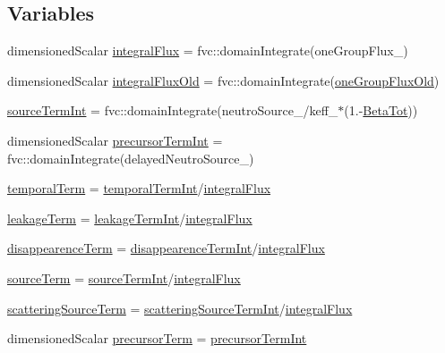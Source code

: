 \subsection*{Variables}
\begin{DoxyCompactItemize}
\item 
dimensioned\+Scalar \hyperlink{integralPredictor_8H_a2a0b08b13037e807e2dd9a5db5f493fa}{integral\+Flux} = fvc\+::domain\+Integrate(one\+Group\+Flux\+\_\+)
\item 
dimensioned\+Scalar \hyperlink{integralPredictor_8H_a96a9327735ca0a4dbb1ca5b12a8f209a}{integral\+Flux\+Old} = fvc\+::domain\+Integrate(\hyperlink{integralPredictorSP3_8H_a34c5d9843ad8c67cedc393b8b7e6d3a0}{one\+Group\+Flux\+Old})
\item 
\hyperlink{integralPredictor_8H_aa5ae446f24d87e14d8bd4df6d043998e}{source\+Term\+Int} = fvc\+::domain\+Integrate(neutro\+Source\+\_\+/keff\+\_\+$\ast$(1.-\/\hyperlink{setXSFieldsSN_8H_a3ad4facb2dd0406d605dcb63190ce6f1}{Beta\+Tot}))
\item 
dimensioned\+Scalar \hyperlink{integralPredictor_8H_a6f122f03262179afd60cc84232ee4bf9}{precursor\+Term\+Int} = fvc\+::domain\+Integrate(delayed\+Neutro\+Source\+\_\+)
\item 
\hyperlink{integralPredictor_8H_aaef87b89b227970fd6792c5bff5dcf92}{temporal\+Term} = \hyperlink{integralPredictorSP3_8H_a6a6bc2b4b802b67f7144e4fd168ce1b5}{temporal\+Term\+Int}/\hyperlink{integralPredictorSP3_8H_a2a0b08b13037e807e2dd9a5db5f493fa}{integral\+Flux}
\item 
\hyperlink{integralPredictor_8H_a3870febfb4d6b903e191a3f6937b92e7}{leakage\+Term} = \hyperlink{integralPredictorSP3_8H_a1edc21b2e8fa9d1796ee10236abc2889}{leakage\+Term\+Int}/\hyperlink{integralPredictorSP3_8H_a2a0b08b13037e807e2dd9a5db5f493fa}{integral\+Flux}
\item 
\hyperlink{integralPredictor_8H_af8dbaf3ece9644da11df447a12a14051}{disappearence\+Term} = \hyperlink{integralPredictorSP3_8H_af3f24745c62331a2c7c7bd0dead37b6a}{disappearence\+Term\+Int}/\hyperlink{integralPredictorSP3_8H_a2a0b08b13037e807e2dd9a5db5f493fa}{integral\+Flux}
\item 
\hyperlink{integralPredictor_8H_a917a012199c77c70638448d199750771}{source\+Term} = \hyperlink{integralPredictorSP3_8H_ac69cf9b0ca49bbc73bbd8757cc3ebae3}{source\+Term\+Int}/\hyperlink{integralPredictorSP3_8H_a2a0b08b13037e807e2dd9a5db5f493fa}{integral\+Flux}
\item 
\hyperlink{integralPredictor_8H_a9aa913bf9329cc3ad657343f9e96ceeb}{scattering\+Source\+Term} = \hyperlink{integralPredictorSP3_8H_a6c06ef7a771d3996b52235080e43589b}{scattering\+Source\+Term\+Int}/\hyperlink{integralPredictorSP3_8H_a2a0b08b13037e807e2dd9a5db5f493fa}{integral\+Flux}
\item 
dimensioned\+Scalar \hyperlink{integralPredictor_8H_a036c76c07f219017fb5141b4e0bdc0d7}{precursor\+Term} = \hyperlink{integralPredictorSP3_8H_a6f122f03262179afd60cc84232ee4bf9}{precursor\+Term\+Int}
\end{DoxyCompactItemize}


